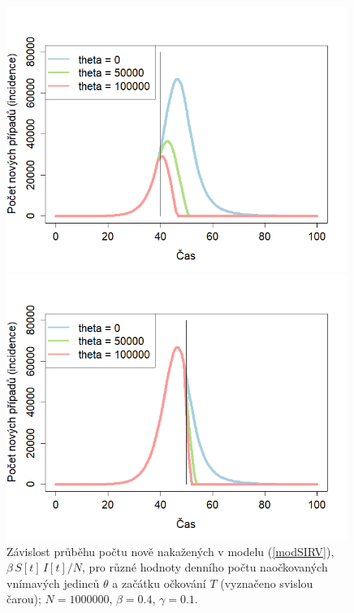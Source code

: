 \begin{figure}[h]
	\begin{center}
		\begin{minipage}[m]{0.45\linewidth}
			\includegraphics[width=0.99\textwidth]{pic/epidemicSIRvacc1.png}
		\end{minipage}
		\hspace{2ex}
		\begin{minipage}[m]{0.45\linewidth}
			\includegraphics[width=0.99\textwidth]{pic/epidemicSIRvacc2.png}
		\end{minipage}
	\end{center}
	\caption{Závislost průběhu počtu nově nakažených v modelu (\ref{modSIRV}), $\beta \, S[t]\,I[t]/N$, pro různé hodnoty denního počtu naočkovaných vnímavých jedinců $\theta$ a začátku očkování $T$ (vyznačeno svislou čarou); $N=1000000$, $\beta=0.4$, $\gamma=0.1$.}
	\label{SIRvacc}
\end{figure}

